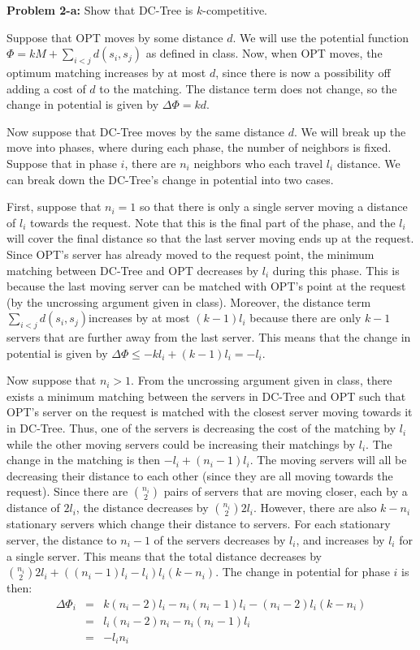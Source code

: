 \documentclass[psamsfonts]{amsart}
\newenvironment{sol}{\vspace{0.25cm}{\large \bfseries Solution:}}{\qedsymbol}
\newenvironment{prob}[1]{\begin{framed}{\large \bfseries Problem #1:}}{\end{framed}}
\begin{document}
\begin{prob}{2-a}
Show that DC-Tree is $k$-competitive.
\end{prob}
\begin{sol}
Suppose that OPT moves by some distance $d$. We will use the potential function $\Phi = kM + \sum_{i < j} d(s_i, s_j)$ as defined in class. Now, when OPT moves, the optimum matching increases by at most $d$, since there is now a possibility off adding a cost of $d$ to the matching. The distance term does not change, so the change in potential is given by $\Delta \Phi = kd$. 

Now suppose that DC-Tree moves by the same distance $d$. We will break up the move into phases, where during each phase, the number of neighbors is fixed. Suppose that in phase $i$, there are $n_i$ neighbors who each travel $l_i$ distance. We can break down the DC-Tree's change in potential into two cases.

First, suppose that $n_i = 1$ so that there is only a single server moving a distance of $l_i$ towards the request. Note that this is the final part of the phase, and the $l_i$ will cover the final distance so that the last server moving ends up at the request. Since OPT's server has already moved to the request point, the minimum matching between DC-Tree and OPT decreases by $l_i$ during this phase. This is because the last moving server can be matched with OPT's point at the request (by the uncrossing argument given in class). Moreover, the distance term $\sum_{i < j} d(s_i, s_j)$increases by at most $(k-1) l_i$ because there are only $k-1$ servers that are further away from the last server. This means that the change in potential is given by $\Delta \Phi \leq -k l_i + (k-1) l_i = - l_i$. 

Now suppose that $n_i > 1$. From the uncrossing argument given in class, there exists a minimum matching between the servers in DC-Tree and OPT such that OPT's server on the request is matched with the closest server moving towards it in DC-Tree. Thus, one of the servers is decreasing the cost of the matching by $l_i$ while the other moving servers could be increasing their matchings by $l_i$. The change in the matching is then $-l_i + (n_i - 1) l_i$. The moving servers will all be decreasing their distance to each other (since they are all moving towards the request). Since there are ${n_i \choose 2}$ pairs of servers that are moving closer, each by a distance of $2l_i$, the distance decreases by ${n_i \choose 2} 2 l_i$. However, there are also $k - n_i$ stationary servers which change their distance to servers. For each stationary server, the distance to $n_i - 1$ of the servers decreases by $l_i$, and increases by $l_i$ for a single server. This means that the total distance decreases by ${n_i \choose 2} 2l_i + ((n_i-1)l_i - l_i) l_i (k - n_i)$. The change in potential for phase $i$ is then:
\begin{eqnarray}
\Delta \Phi_i &=& k (n_i-2)l_i - n_i(n_i-1)l_i - (n_i-2)l_i(k-n_i) \\
&=& l_i (n_i - 2) n_i - n_i( n_i-1) l_i \\
&=& -l_i n_i
\end{eqnarray}


\end{sol}
\end{document}
